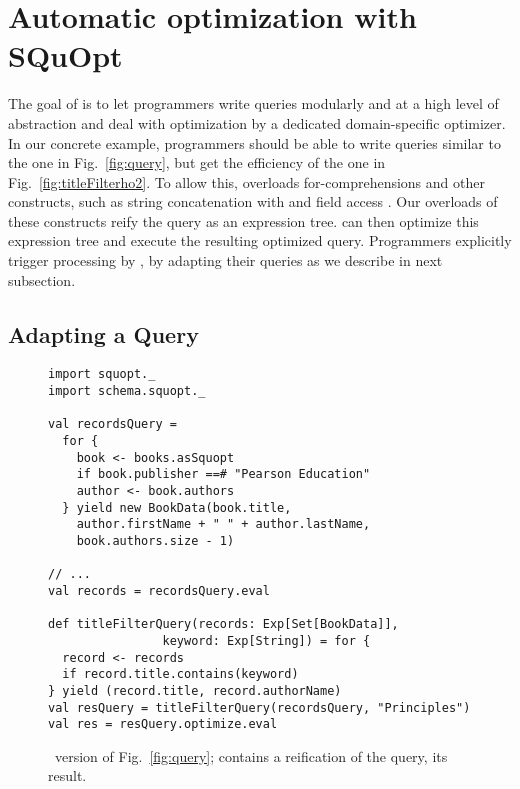 \section{Automatic optimization with \\SQuOpt}

\label{sec:solution}
The goal of {\LoS} is to let programmers write queries modularly and at a high level of abstraction and deal with optimization by a dedicated domain-specific optimizer. In our concrete example,
programmers should be able to write queries similar to the one in Fig.~\ref{fig:query}, but get the efficiency of the one in Fig.~\ref{fig:titleFilterho2}.
To allow this, {\LoS} overloads for-comprehensions and other constructs, such as string concatenation with \code{+} and field access . Our overloads of these constructs reify the query as an expression tree. {\LoS} can then optimize this expression tree and execute the resulting optimized query.
Programmers explicitly trigger processing by {\LoS}, by adapting their queries as we describe in next subsection.

\subsection{Adapting a Query}
\label{subsec:adaptingaquery}
\begin{figure}
\centering
\begin{lstlisting}
import squopt._
import schema.squopt._

val recordsQuery =
  for {
    book <- books.asSquopt
    if book.publisher ==# "Pearson Education"
    author <- book.authors
  } yield new BookData(book.title,
    author.firstName + " " + author.lastName,
    book.authors.size - 1)

// ...
val records = recordsQuery.eval

def titleFilterQuery(records: Exp[Set[BookData]], 
                keyword: Exp[String]) = for {
  record <- records
  if record.title.contains(keyword)
} yield (record.title, record.authorName)
val resQuery = titleFilterQuery(recordsQuery, "Principles")
val res = resQuery.optimize.eval
\end{lstlisting}
\caption{\LoS\ version of Fig.~\ref{fig:query};  contains a reification of the query,  its result.}
\label{fig:reifiedQuery}
\end{figure}

